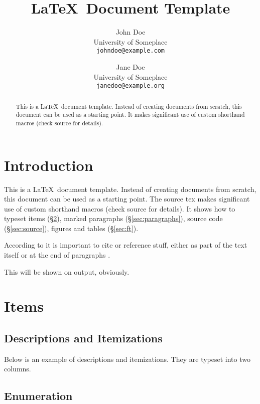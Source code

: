 \documentclass[12pt,a4paper]{article}
\title{\LaTeX\ Document Template}
\author{
	John Doe \\
	{\small University of Someplace} \\
	\texttt{\footnotesize johndoe@example.com} \\
\and
	Jane Doe \\
	{\small University of Someplace} \\
	\texttt{\footnotesize janedoe@example.org} \\
}
\begin{document}
\maketitle

\begin{abstract}
This is a \LaTeX\ document template.  Instead of creating documents from
scratch, this document can be used as a starting point.  It makes significant
use of custom shorthand macros (check source for details).
\end{abstract}

\tableofcontents
\pagebreak


\section{Introduction}

This is a \LaTeX\ document template.  Instead of creating documents from
scratch, this document can be used as a starting point.  The source tex makes
significant use of custom shorthand macros (check source for details).  It
shows how to typeset items (\S\ref{sec:items}), marked paragraphs
(\S\ref{sec:paragraphs}), source code (\S\ref{sec:source}), figures and tables
(\S\ref{sec:ft}).

According to \citet{proposing-proposals} it is important to cite or reference
stuff, either as part of the text itself or at the end of paragraphs
\citep{something,proposing-proposals}.

This will be shown on output, obviously.


\section{Items}
\label{sec:items}

\subsection{Descriptions and Itemizations}

Below is an example of descriptions and itemizations.  They are typeset into
two columns. 


\subsection{Enumeration}
\label{sec:enumeration}
\end{document}
